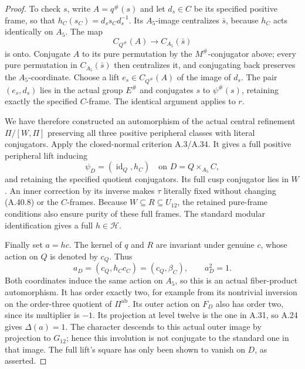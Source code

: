 \begin{proof}
To check \(s\), write \(A=q^\#(s)\) and let
\(d_s\in C\) be its specified positive frame,
so that \(h_C(s_C)=d_s s_Cd_s^{-1}\).
Its \(A_5\)-image centralizes \(\bar s\),
because \(h_C\) acts identically on \(A_5\).
The map
\[
          C_{Q^\#}(A)\longrightarrow C_{A_5}(\bar s)
 \tag{A.40.7}
\]
is onto. Conjugate \(A\) to its pure permutation
by the \(M^\#\)-conjugator above; every pure
permutation in \(C_{A_5}(\bar s)\) then
centralizes it, and conjugating back preserves
the \(A_5\)-coordinate. Choose a lift
\(e_s\in C_{Q^\#}(A)\) of the image of
\(d_s\). The pair \((e_s,d_s)\) lies in the
actual group \(E^\#\) and conjugates \(s\)
to \(\psi^\#(s)\), retaining exactly the
specified \(C\)-frame. The identical argument
applies to \(r\).

We have therefore constructed an automorphism of
the actual central refinement
\(\Pi/[W,\Pi]\) preserving all three positive
peripheral classes with literal conjugators.
Apply the closed-normal criterion A.3/A.34.
It gives a full positive peripheral lift inducing
\[
             \psi_D=(\operatorname{id}_Q,h_C)
                \quad\text{on }D=Q\times_{A_5}C,
 \tag{A.40.8}
\]
and retaining the specified quotient conjugators.
Its full cusp conjugator lies in \(W\). An inner
correction by its inverse makes \(\tau\) literally
fixed without changing (A.40.8) or the \(C\)-frames.
Because \(W\subseteq R\subseteq U_{12}\), the
retained pure-frame conditions also ensure purity
of these full frames. The standard modular
identification gives a full \(h\in\mathcal H\).

Finally set \(a=hc\). The kernel of \(q\) and
\(R\) are invariant under genuine \(c\), whose
action on \(Q\) is denoted by \(c_Q\). Thus
\[
       a_D=(c_Q,h_Cc_C)=(c_Q,\beta_C),
       \qquad a_D^2=1.
 \tag{A.40.9}
\]
Both coordinates induce the same action on
\(A_5\), so this is an actual fiber-product
automorphism. It has order exactly two, for
example from its nontrivial inversion on the
order-three quotient of \(\Pi^{\mathrm{ab}}\).
Its outer action on \(F_D\) also has order two,
since its multiplier is \(-1\). Its projection
at level twelve is the one in A.31, so A.24
gives \(\Delta(a)=1\). The character descends
to this actual outer image by projection to
\(G_{12}\); hence this involution is not
conjugate to the standard one in that image.
The full lift's square has only been shown to
vanish on \(D\), as asserted.
\end{proof}

